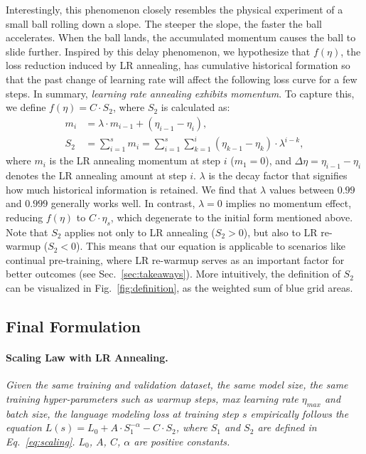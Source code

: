 Interestingly, this phenomenon closely resembles the physical experiment of a small ball rolling down a slope.
The steeper the slope, the faster the ball accelerates. 
When the ball lands, the accumulated momentum causes the ball to slide further.
Inspired by this delay phenomenon, we hypothesize that $f(\eta)$, the loss reduction induced by LR annealing, has cumulative historical formation so that the past change of learning rate will affect the following
loss curve for a few steps.
In summary, \emph{learning rate annealing exhibits momentum}. 
To capture this, we define $f(\eta) = C\cdot S_2$, where $S_2$ is calculated as:
\begin{equation}
\label{eq:definition-s2}
\begin{aligned}
    m_i &= \lambda \cdot m_{i-1} + (\eta_{i-1} - \eta_i), \\
    S_2 &= \sum\limits_{i=1}^{s}m_i = \sum\limits_{i=1}^{s}\sum\limits_{k=1}^{i}(\eta_{k-1} - \eta_{k})\cdot \lambda^{i-k},
\end{aligned}
\end{equation}
where $m_i$ is the LR annealing momentum at step $i$ ($m_1=0$), and $\Delta \eta = \eta_{i-1} - \eta_i$ denotes the LR annealing amount at step $i$. $\lambda$ is the decay factor that signifies how much historical information is retained. 
We find that $\lambda$ values between $0.99$ and $0.999$ generally works well. 
In contrast, $\lambda=0$ implies no momentum effect, reducing $f(\eta)$ to $C\cdot\eta_s$, which degenerate to the initial form mentioned above. 
Note that $S_2$ applies not only to LR annealing ($S_2>0$), but also to LR re-warmup ($S_2<0$). This means that our equation is applicable to scenarios like continual pre-training, where LR re-warmup serves
as an important factor for better outcomes (see Sec.~\ref{sec:takeaways}). 
More intuitively, the definition of $S_2$ can be visualized
in Fig.~\ref{fig:definition}, as the weighted sum of blue grid areas.


\subsection{Final Formulation}
\paragraph{Scaling Law with LR Annealing.}
\emph{Given the same training and validation dataset, the same model size, the same training hyper-parameters such as warmup steps, max learning rate $\eta_{max}$ and batch size, the language modeling loss at training step $s$ empirically follows the equation $L(s) = L_0 + A\cdot S_1^{-\alpha} - C\cdot S_2$, where $S_1$ and $S_2$ are defined in Eq.~\ref{eq:scaling}. $L_0$, $A$, $C$, $\alpha$ are positive constants.}

